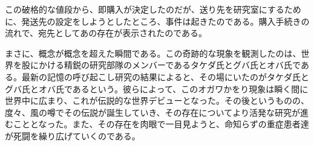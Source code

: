 この破格的な値段から、即購入が決定したのだが、送り先を研究室にするために、発送先の設定をしようとしたところ、事件は起きたのである。購入手続きの流れで、宛先としてあの存在が表示されたのである。\\


まさに、概念が概念を超えた瞬間である。この奇跡的な現象を観測したのは、世界を股にかける精鋭の研究部隊のメンバーであるタケダ氏とグバ氏とオバ氏である。最新の記憶の呼び起こし研究の結果によると、その場にいたのがタケダ氏とグバ氏とオバ氏であるという。彼らによって、このオガワかをり現象は瞬く間に世界中に広まり、これが伝説的な世界デビューとなった。その後というものの、度々、風の噂でその伝説が誕生していき、その存在についてより活発な研究が進むこととなった。また、その存在を肉眼で一目見ようと、命知らずの重症患者達が死闘を繰り広げていくのである。




